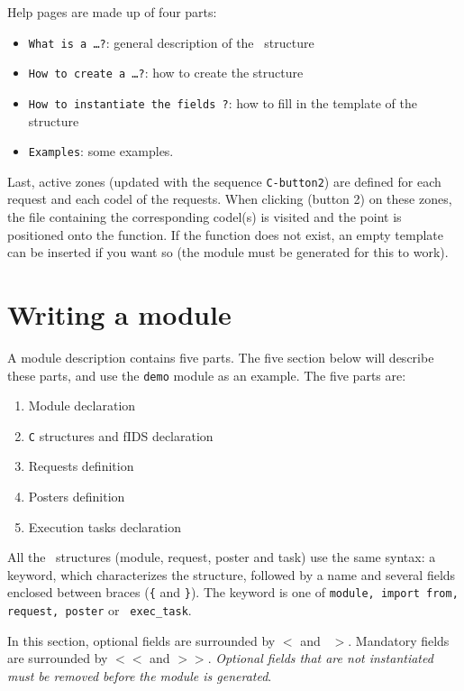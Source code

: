 Help pages are made up of four parts:

\begin{itemize}
\item {\tt What is a \ldots ?}: general description of the \GenoM\
structure
\item {\tt How to create a \ldots ?}: how to create the structure
\item {\tt How to instantiate the fields ?}: how to fill in the template
of the structure
\item {\tt Examples}: some examples.
\end{itemize}

Last,  active   zones (updated  with   the sequence  {\tt C-button2}) are
defined for each request and each codel  of the requests. When clicking
(button 2) on these zones, the file containing the corresponding codel(s)
is visited  and the point is positioned  onto the function. If the function
does not exist,  an empty template can  be inserted if  you want so  (the
module must be generated for this to work).


\section{Writing a module}

A  module description contains five   parts. The five section below  will
describe these parts, and use the {\tt demo} module as an example.
The five parts are:

\begin{enumerate}
\item Module declaration
\item {\tt C} structures and fIDS declaration
\item Requests definition
\item Posters definition
\item Execution tasks declaration
\end{enumerate}

All the  \GenoM\ structures (module,  request, poster  and task) use  the
same syntax: a keyword, which characterizes the  structure, followed by a
name and several fields enclosed between  braces ({\tt \{} and {\tt \}}).
The keyword is one of {\tt module, import  from, request, poster} or {\tt
exec\_task}.

In this section, optional  fields are  surrounded  by {\tt $<$} and  {\tt
$>$}. Mandatory fields are surrounded by  {\tt $<<$} and {\tt $>>$}. {\em
Optional   fields that are not  instantiated  must  be removed before the
module is generated}.


